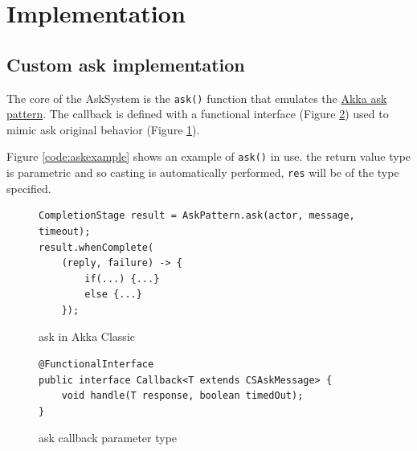 \documentclass[a4paper]{article}
\begin{document}
    \section{Implementation}
        \subsection{Custom ask implementation}
            The core of the AskSystem is the \texttt{ask()} function that emulates the \href{https://doc.akka.io/libraries/akka-core/current/typed/interaction-patterns.html}{Akka ask pattern}.
            The callback is defined with a functional interface (Figure \ref{code:askfinterface}) used to mimic ask original behavior (Figure \ref{code:askoriginal}).
            
            Figure \ref{code:askexample} shows an example of \texttt{ask()} in use. the return value type is parametric and so casting is automatically performed, \texttt{res} will be of the type specified.

            \begin{figure}[H]
             \begin{verbatim}
CompletionStage result = AskPattern.ask(actor, message, timeout);
result.whenComplete(
    (reply, failure) -> {
        if(...) {...}
        else {...}
    });
                \end{verbatim}
                \caption{ask in Akka Classic}
                \label{code:askoriginal}
            \end{figure}
            
            \begin{figure}[H]
                \centering
                \begin{verbatim}
@FunctionalInterface
public interface Callback<T extends CSAskMessage> {
    void handle(T response, boolean timedOut);
}
                \end{verbatim}
                \caption{ask callback parameter type}
                \label{code:askfinterface}
            \end{figure}
\end{document}
